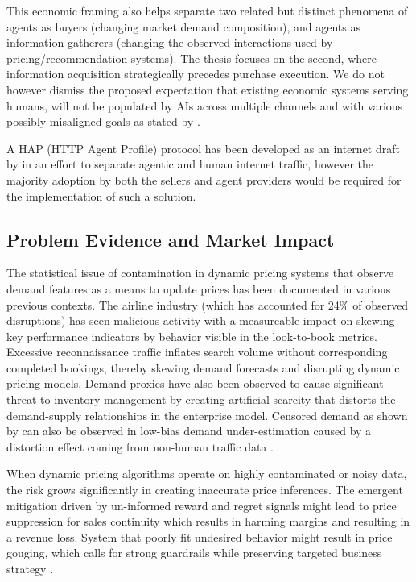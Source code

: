 This economic framing also helps separate two related but distinct phenomena of agents as buyers (changing market demand composition), and agents as information gatherers (changing the observed interactions used by pricing/recommendation systems). The thesis focuses on the second, where information acquisition strategically precedes purchase execution. We do not however dismiss the proposed expectation that existing economic systems serving humans, will not be populated by AIs across multiple channels and with various possibly misaligned goals as stated by \textcite{parkes_economic_2015}.

A HAP (HTTP Agent Profile) protocol has been developed as an internet draft by \textcite{dhir_http_2025} in an effort to separate agentic and human internet traffic, however the majority adoption by both the sellers and agent providers would be required for the implementation of such a solution.

\subsection{Problem Evidence and Market Impact}

The statistical issue of contamination in dynamic pricing systems that observe demand features as a means to update prices has been documented in various previous contexts. The airline industry (which has accounted for 24\% of observed disruptions) has seen malicious activity with a measureable impact on skewing key performance indicators by behavior visible in the look-to-book metrics. Excessive reconnaissance traffic inflates search volume without corresponding completed bookings, thereby skewing demand forecasts and disrupting dynamic pricing models. Demand proxies have also been observed to cause significant threat to inventory management by creating artificial scarcity that distorts the demand-supply relationships in the enterprise model. Censored demand as shown by \textcite{amjad_censored_2017} can also be observed in low-bias demand under-estimation caused by a distortion effect coming from non-human traffic data \parencite{imperva_rapid_2025}.

When dynamic pricing algorithms operate on highly contaminated or noisy data, the risk grows significantly in creating inaccurate price inferences. The emergent mitigation driven by un-informed reward and regret signals might lead to price suppression for sales continuity which results in harming margins and resulting in a revenue loss. System that poorly fit undesired behavior might result in price gouging, which calls for strong guardrails while preserving targeted business strategy \parencite{mullapudi_reinforcement_2025}.


